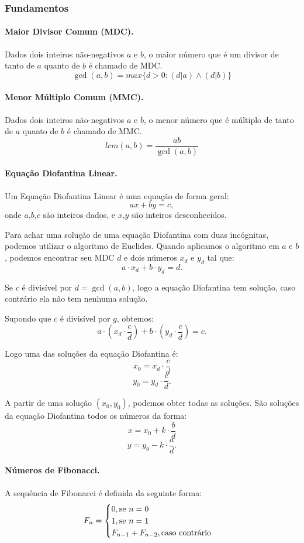 \subsubsection{Fundamentos}
\paragraph{Maior Divisor Comum (MDC).} Dados dois inteiros não-negativos $a$ e $b$, o maior número que é um divisor de tanto de $a$ quanto de $b$ é chamado de MDC.
$$\gcd(a,b)=max\{d > 0 : (d|a) \land (d|b)\}$$

\paragraph{Menor Múltiplo Comum (MMC).} Dados dois inteiros não-negativos $a$ e $b$, o menor número que é múltiplo de tanto de $a$ quanto de $b$ é chamado de MMC.
$$lcm(a,b)=\frac{ab}{\gcd(a,b)}$$

\paragraph{Equação Diofantina Linear.} Um Equação Diofantina Linear é uma equação de forma geral:
$$ax +by=c,$$
onde $a$,$b$,$c$ são inteiros dados, e $x$,$y$ são inteiros desconhecidos.

Para achar uma solução de uma equação Diofantina com duas incógnitas, podemos utilizar o algoritmo de Euclides. Quando aplicamos o algoritmo em $a$ e $b$, podemos encontrar seu MDC $d$ e dois números $x_d$ e $y_d$ tal que:
$$a\cdot x_d+b\cdot y_d = d.$$

Se $c$ é divisível por $d = \gcd(a,b)$, logo a equação Diofantina tem solução, caso contrário ela não tem nenhuma solução. 

Supondo que $c$ é divisível por $g$, obtemos:
$$a\cdot(x_d\cdot\frac{c}{d})+b\cdot(y_d\cdot\frac{c}{d})=c.$$

Logo uma das soluções da equação Diofantina é:
$$x_0 = x_d\cdot\frac{c}{d}$$ $$y_0=y_d\cdot\frac{c}{d}.$$

A partir de uma solução $(x_0,y_0)$, podemos obter todas as soluções. São soluções da equação Diofantina todos os números da forma:
$$x = x_0+k\cdot\frac{b}{d}$$ $$y = y_0-k\cdot\frac{a}{d}.$$

\paragraph{Números de Fibonacci.} A sequência de Fibonacci é definida da seguinte forma: 
$$F_n = \begin{cases}
            0,\textnormal{se } n=0 \\
            1,\textnormal{se } n=1 \\
            F_{n-1}+F_{n-2},\textnormal{caso contrário}
        \end{cases}$$

